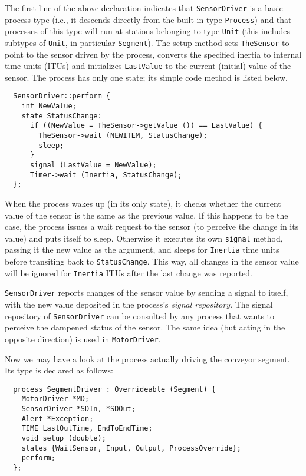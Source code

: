 The first line of the above declaration indicates that {\tt SensorDriver}
is a basic process type (i.e., it descends directly from the built-in
type {\tt Process}) and that processes of this type will run at stations
belonging to type {\tt Unit} (this includes subtypes of {\tt Unit},
in particular {\tt Segment}).
The setup method sets {\tt TheSensor} to point to the sensor driven by the
process, converts the specified inertia to internal time units (ITUs)
and initializes {\tt LastValue} to the current (initial) value of the
sensor.
The process has only one state; its simple code method is listed below.

{\small\begin{verbatim}
  SensorDriver::perform {
    int NewValue;
    state StatusChange:
      if ((NewValue = TheSensor->getValue ()) == LastValue) {
        TheSensor->wait (NEWITEM, StatusChange);
        sleep;
      }
      signal (LastValue = NewValue);
      Timer->wait (Inertia, StatusChange);
  };
\end{verbatim}}

When the process wakes up (in its only state), it checks whether the
current value of the sensor is the same as the previous value.
If this happens to be the case, the process issues a wait request to the
sensor (to perceive the change in its value) and puts itself to sleep.
Otherwise it executes its own {\tt signal} method, passing it the new
value as the argument, and sleeps for {\tt Inertia} time units before
transiting back to {\tt StatusChange}.
This way, all changes in the sensor value will be ignored for
{\tt Inertia} ITUs after the last change was reported.

{\tt SensorDriver} reports changes of the sensor value by sending a
signal to itself, with the new value deposited in
the process's {\em signal repository}.
The signal repository of {\tt SensorDriver} can be consulted by any
process that wants to perceive the dampened status of the sensor.
The same idea (but acting in the opposite direction)
is used in {\tt MotorDriver}.

Now we may have a look at the process actually driving the conveyor segment.
Its type is declared as follows:

{\small\begin{verbatim}
  process SegmentDriver : Overrideable (Segment) {
    MotorDriver *MD;
    SensorDriver *SDIn, *SDOut;
    Alert *Exception;
    TIME LastOutTime, EndToEndTime;
    void setup (double);
    states {WaitSensor, Input, Output, ProcessOverride};
    perform;
  };
\end{verbatim}}

